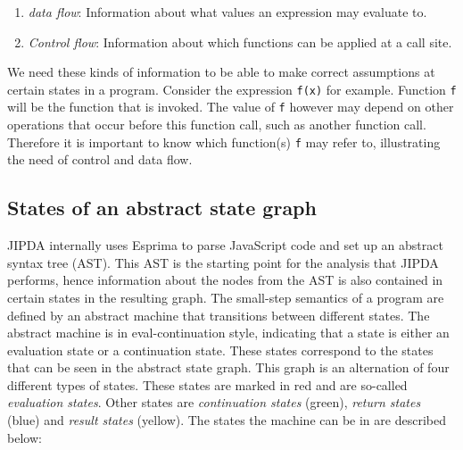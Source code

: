 \begin{enumerate}
\item \textit{data flow}: Information about what values an expression may evaluate to.
\item \textit{Control flow}: Information about which functions can be applied at a call site.
\end{enumerate}

We need these kinds of information to be able to make correct assumptions at certain states in a program. Consider the expression \texttt{f(x)} for example. Function \texttt{f} will be the function that is invoked. The value of \texttt{f} however may depend on other operations that occur before this function call, such as another function call. Therefore it is important to know which function(s) \texttt{f} may refer to, illustrating the need of control and data flow.

\subsection*{States of an abstract state graph}

JIPDA internally uses Esprima\cite{Esprima} to parse JavaScript code and set up an abstract syntax tree (AST). This AST is the starting point for the analysis that JIPDA performs, hence information about the nodes from the AST is also contained in certain states in the resulting graph. The small-step semantics of a program are defined by an abstract machine that transitions between different states. The abstract machine is in eval-continuation style, indicating that a state is either an evaluation state or a continuation state. These states correspond to the states that can be seen in the abstract state graph. This graph is an alternation of four different types of states. These states are marked in red and are so-called \textit{evaluation states}. Other states are \textit{continuation states} (green), \textit{return states} (blue) and \textit{result states} (yellow). The states the machine can be in are described below:

